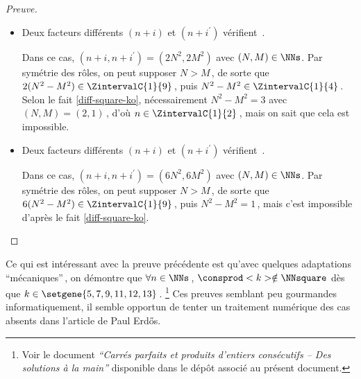 \begin{proof}[Preuve]
\begin{itemize}
    	\medskip
		\item Deux facteurs différents $(n+i)$ et $(n+i^\prime)$ vérifient \,.
		
		\smallskip
		\noindent
		Dans ce cas, $(n+i, n+i^\prime) = (2 N^2, 2 M^2)$ avec $(N, M) \in \NNs$.
		Par symétrie des rôles, on peut supposer $N > M$\,, de sorte que $2(N^2 - M^2) \in \ZintervalC{1}{9}$\,, puis $N^2 - M^2 \in \ZintervalC{1}{4}$\,. 
		Selon le fait \ref{diff-square-ko}, nécessairement $N^2 - M^2 = 3$ avec $(N, M) = (2, 1)$\,, d'où $n \in \ZintervalC{1}{2}$\,, mais on sait que cela est impossible.


    	\medskip
		\item Deux facteurs différents $(n+i)$ et $(n+i^\prime)$ vérifient \,.
		
		\smallskip
		\noindent
		Dans ce cas, $(n+i, n+i^\prime) = (6 N^2, 6 M^2)$ avec $(N, M) \in \NNs$.
		Par symétrie des rôles, on peut supposer $N > M$\,, de sorte que $6(N^2 - M^2) \in \ZintervalC{1}{9}$\,, puis $N^2 - M^2 = 1$\,, mais c'est impossible d'après le fait \ref{diff-square-ko}.
		\qedhere
    \end{itemize}
\end{proof}




Ce qui est intéressant avec la preuve précédente est qu'avec quelques adaptations \enquote{mécaniques}\,, on démontre que $\forall n \in \NNs$\,, $\consprod<k> \notin \NNsquare$ dès que $k \in \setgene{5, 7, 9, 11, 12, 13}$\,.
\footnote{
	Voir le document \emph{\enquote{Carrés parfaits et produits d'entiers consécutifs -- Des solutions à la main}} disponible dans le dépôt associé au présent document.
}
Ces preuves semblant peu gourmandes informatiquement, il semble opportun de tenter un traitement numérique des cas absents dans l'article de Paul Erdős. 

